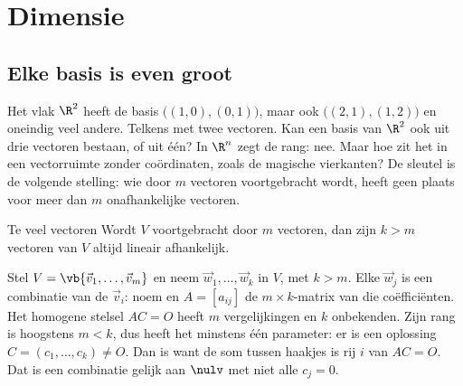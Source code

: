 \begin{oefeningen}
\end{oefeningen}

\section{Dimensie}

\subsection{Elke basis is even groot}

Het vlak $\R^2$ heeft de basis $\bigl((1, 0), (0, 1)\bigr)$, maar ook $\bigl((2, 1), (1, 2)\bigr)$ en oneindig veel andere. Telkens met twee vectoren. Kan een basis van $\R^2$ ook uit drie vectoren bestaan, of uit één? In $\R^n$ zegt de rang: nee. Maar hoe zit het in een vectorruimte zonder coördinaten, zoals de magische vierkanten? De sleutel is de volgende stelling: wie door $m$ vectoren voortgebracht wordt, heeft geen plaats voor meer dan $m$ onafhankelijke vectoren.

\begin{theorie}
\begin{stelling}{Te veel vectoren}
Wordt $V$ voortgebracht door $m$ vectoren, dan zijn $k > m$ vectoren van $V$ altijd lineair afhankelijk.
\end{stelling}

\begin{bewijs}
Stel $V = \vb{\vec v_1, \ldots, \vec v_m}$ en neem $\vec w_1, \ldots, \vec w_k$ in $V$, met $k > m$. Elke $\vec w_j$ is een combinatie van de $\vec v_i$: noem
en $A = [a_{ij}]$ de $m \times k$-matrix van die coëfficiënten. Het homogene stelsel $AC = O$ heeft $m$ vergelijkingen en $k$ onbekenden. Zijn rang is hoogstens $m < k$, dus heeft het minstens één parameter: er is een oplossing $C = (c_1, \ldots, c_k) \neq O$. Dan is
want de som tussen haakjes is rij $i$ van $AC = O$. Dat is een combinatie gelijk aan $\nulv$ met niet alle $c_j = 0$.
\end{bewijs}
\end{theorie}

